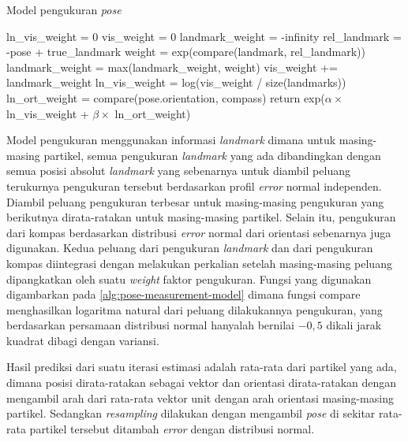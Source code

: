 \begin{algorithm}
    \caption{Model pengukuran \textit{pose}}
    \label{alg:pose-measurement-model}
    \begin{algorithmic}[1]
        \State ln\_vis\_weight = $0$
        \State vis\_weight = $0$
        \State landmark\_weight = -infinity
        \State rel\_landmark = -pose + true\_landmark
        \State weight = exp(compare(landmark, rel\_landmark))
        \State landmark\_weight = max(landmark\_weight, weight)
        \EndFor
        \State vis\_weight += landmark\_weight
        \EndFor
        \State ln\_vis\_weight = log(vis\_weight / size(landmarks))
        \EndIf
        \State ln\_ort\_weight = compare(pose.orientation, compass)
        \State return exp($\alpha \times$ ln\_vis\_weight + $\beta \times$ ln\_ort\_weight)
        \EndFunction
    \end{algorithmic}
\end{algorithm}

Model pengukuran menggunakan informasi \textit{landmark} dimana untuk masing-masing partikel, semua pengukuran \textit{landmark} yang ada dibandingkan dengan semua posisi absolut \textit{landmark} yang sebenarnya untuk diambil peluang terukurnya pengukuran tersebut berdasarkan profil \textit{error} normal independen. Diambil peluang pengukuran terbesar untuk masing-masing pengukuran yang berikutnya dirata-ratakan untuk masing-masing partikel. Selain itu, pengukuran dari kompas berdasarkan distribusi \textit{error} normal dari orientasi sebenarnya juga digunakan. Kedua peluang dari pengukuran \textit{landmark} dan dari pengukuran kompas diintegrasi dengan melakukan perkalian setelah masing-masing peluang dipangkatkan oleh suatu \textit{weight} faktor pengukuran. Fungsi yang digunakan digambarkan pada \ref{alg:pose-measurement-model} dimana fungsi compare menghasilkan logaritma natural dari peluang dilakukannya pengukuran, yang berdasarkan persamaan distribusi normal hanyalah bernilai $-0,5$ dikali jarak kuadrat dibagi dengan variansi.

Hasil prediksi dari suatu iterasi estimasi adalah rata-rata dari partikel yang ada, dimana posisi dirata-ratakan sebagai vektor dan orientasi dirata-ratakan dengan mengambil arah dari rata-rata vektor unit dengan arah orientasi masing-masing partikel. Sedangkan \textit{resampling} dilakukan dengan mengambil \textit{pose} di sekitar rata-rata partikel tersebut ditambah \textit{error} dengan distribusi normal.

